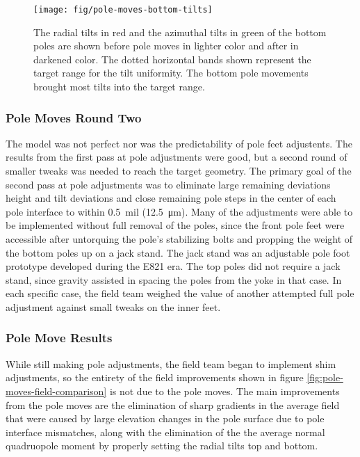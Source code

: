 \begin{figure}
\centering
\texttt{[image: fig/pole-moves-bottom-tilts]}
\caption{
    The radial tilts in red and the azimuthal tilts in green of the bottom poles are shown before pole moves in lighter color and after in darkened color.  The dotted horizontal bands shown represent the target range for the tilt uniformity.  The bottom pole movements brought most tilts into the target range. 
    \label{fig:pole-moves-bottom-tilts}
}
\end{figure}

\subsubsection{Pole Moves Round Two}

The model was not perfect nor was the predictability of pole feet adjustents.  The results from the first pass at pole adjustments were good, but a second round of smaller tweaks was needed to reach the target geometry.  The primary goal of the second pass at pole adjustments was to eliminate large remaining deviations height and tilt deviations and close remaining pole steps in the center of each pole interface to within \SI{0.5}{mil} (\SI{12.5}{\micro\meter}).  Many of the adjustments were able to be implemented without full removal of the poles, since the front pole feet were accessible after untorquing the pole's stabilizing bolts and propping the weight of the bottom poles up on a jack stand.  The jack stand was an adjustable pole foot prototype developed during the E821 era.  The top poles did not require a jack stand, since gravity assisted in spacing the poles from the yoke in that case.  In each specific case, the field team weighed the value of another attempted full pole adjustment against small tweaks on the inner feet.

\subsubsection{Pole Move Results}

While still making pole adjustments, the field team began to implement shim adjustments, so the entirety of the field improvements shown in figure \ref{fig:pole-moves-field-comparison} is not due to the pole moves.  The main improvements from the pole moves are the elimination of sharp gradients in the average field that were caused by large elevation changes in the pole surface due to pole interface mismatches, along with the elimination of the the average normal quadruopole moment by properly setting the radial tilts top and bottom.

